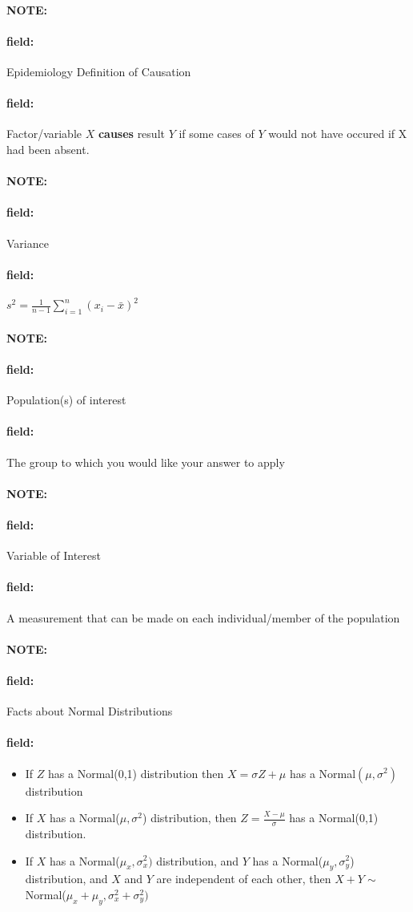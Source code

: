 \documentclass[12pt]{article}
\newenvironment{note}{\paragraph{NOTE:}}{}
\newenvironment{field}{\paragraph{field:}}{}
\begin{document}
\begin{note}
    \begin{field}
        Epidemiology Definition of Causation
    \end{field}
    \begin{field}
        Factor/variable $X$ \textbf{causes} result $Y$ if some cases of $Y$ would not have occured if X had been absent.
    \end{field}
\end{note}

\begin{note}
    \begin{field}
        Variance
    \end{field}
    \begin{field}
        $s^2 = \frac{1}{n-1}\sum_{i=1}^n(x_i - \bar{x})^2$
    \end{field}
\end{note}

\begin{note}
    \begin{field}
        Population(s) of interest
    \end{field}
    \begin{field}
        The group to which you would like your answer to apply
    \end{field}
\end{note}

\begin{note}
    \begin{field}
        Variable of Interest
    \end{field}
    \begin{field}
        A measurement that can be made on each individual/member of the population
    \end{field}
\end{note}

\begin{note}
    \begin{field}
        Facts about Normal Distributions
    \end{field}
    \begin{field}
        \begin{itemize}
              \item If $Z$ has a Normal(0,1) distribution then $X = \sigma Z + \mu$ has a Normal$(\mu,\sigma^2)$ distribution
              \item If $X$ has a Normal($\mu,\sigma^2$) distribution, then $Z = \frac{X - \mu}{\sigma}$ has a Normal(0,1) distribution.
              \item If $X$ has a Normal($\mu_x,\sigma^2_x)$ distribution, and $Y$ has a Normal($\mu_y,\sigma_y^2$) distribution, and $X$ and $Y$ are independent of each other, then $X + Y \sim $ Normal($\mu_x + \mu_y, \sigma_x^2 + \sigma_y^2)$
            \end{itemize}
    \end{field}
\end{note}
\end{document}
